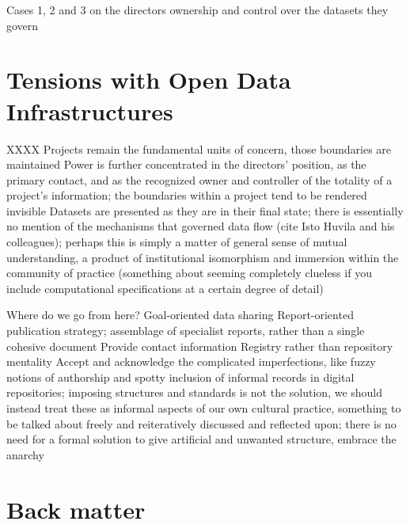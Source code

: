 \documentclass{beamer}
\begin{document}
\begin{frame}
  Cases 1, 2 and 3 on the directors ownership and control over the datasets they govern

\end{frame}

\section{Tensions with Open Data Infrastructures}

\begin{frame}{XXXX}
  Projects remain the fundamental units of concern, those boundaries are maintained
  Power is further concentrated in the directors' position, as the primary contact, and as the recognized owner and controller of the totality of a project's information; the boundaries within a project tend to be rendered invisible
  Datasets are presented as they are in their final state; there is essentially no mention of the mechanisms that governed data flow (cite Isto Huvila and his colleagues); perhaps this is simply a matter of general sense of mutual understanding, a product of institutional isomorphism and immersion within the community of practice (something about seeming completely clueless if you include computational specifications at a certain degree of detail)

\end{frame}

\begin{frame}{Where do we go from here?}
  Goal-oriented data sharing
  Report-oriented publication strategy; assemblage of specialist reports, rather than a single cohesive document
  Provide contact information
  Registry rather than repository mentality
  Accept and acknowledge the complicated imperfections, like fuzzy notions of authorship and spotty inclusion of informal records in digital repositories; imposing structures and standards is not the solution, we should instead treat these as informal aspects of our own cultural practice, something to be talked about freely and reiteratively discussed and reflected upon; there is no need for a formal solution to give artificial and unwanted structure, embrace the anarchy


\end{frame}

\section*{Back matter}
\end{document}
